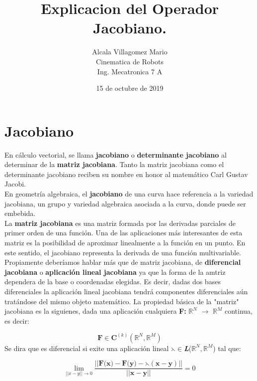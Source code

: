 \documentclass[letter,openrigh,12pt,spanish]{report}
\title{\textbf{Explicacion del Operador Jacobiano.}}
\author{Alcala Villagomez Mario\\
		Cinematica de Robots\\
		Ing. Mecatronica 7 A}
\date{15 de octubre de 2019}
\begin{document}
\maketitle

\section{Jacobiano}
En c\'alculo vectorial, se llama \textbf{jacobiano} o \textbf{determinante jacobiano} al determinar de la \textbf{matriz jacobiana}. Tanto la matriz jacobiana como el determinante jacobiano reciben su nombre en honor al matem\'atico Carl Gustav Jacobi.\\
En geometr\'ia algebraica, el \textbf{jacobiano} de una curva hace referencia a la variedad jacobiana, un grupo y variedad algebraica asociada a la curva, donde puede ser embebida.\\
La \textbf{matriz jacobiana} es una matriz formada por las derivadas parciales de primer orden de una funci\'on. Una de las aplicaciones m\'as interesantes de esta matriz es la posibilidad de aproximar linealmente a la funci\'on en un punto. En este sentido, el jacobiano representa la derivada de una funci\'on multivariable.\\
Propiamente deber\'iamos hablar m\'as que de matriz jacobiana, de \textbf{diferencial jacobiana} o \textbf{aplicaci\'on lineal jacobiana} ya que la forma de la amtriz dependera de la base o coordenadas elegidas. Es decir, dadas dos bases diferenciales la aplicaci\'on lineal jacobiana tendr\'a componentes diferenciales a\'un trat\'andose del mismo objeto matem\'atico. La propiedad b\'asica de la "matriz" jacobiana es la siguienes, dada una aplicaci\'on cualquiera \textbf{F:} $\mathbb{R}^N$ $\longrightarrow$ $\mathbb{R}^M$ continua, es decir:

\begin{displaymath}
\textbf{F}\in\textbf{C}^{(k)}(\mathbb{R}^N,\mathbb{R}^M)
\end{displaymath}
Se dira que es diferencial si exite una aplicaci\'on lineal \textbf{$\leftthreetimes$}$\in$\textbf{\textit{L}}($\mathbb{R}^N,\mathbb{R}^M$) tal que:

\begin{center}
\begin{displaymath}
\lim\limits_{||x-y|| \rightarrow 0} \frac{||\textbf{F(x)}-\textbf{F(y)}-\leftthreetimes(\textbf{x}-\textbf{y})||}{||\textbf{x}-\textbf{y}||}=0
\end{displaymath}
\end{center}
\end{document}
